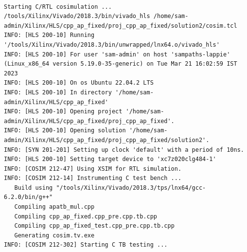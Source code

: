 \documentclass{article}
\begin{document}
\begin{lstlisting}

Starting C/RTL cosimulation ...
/tools/Xilinx/Vivado/2018.3/bin/vivado_hls /home/sam-admin/Xilinx/HLS/cpp_ap_fixed/proj_cpp_ap_fixed/solution2/cosim.tcl
INFO: [HLS 200-10] Running '/tools/Xilinx/Vivado/2018.3/bin/unwrapped/lnx64.o/vivado_hls'
INFO: [HLS 200-10] For user 'sam-admin' on host 'sampaths-lappie' (Linux_x86_64 version 5.19.0-35-generic) on Tue Mar 21 16:02:59 IST 2023
INFO: [HLS 200-10] On os Ubuntu 22.04.2 LTS
INFO: [HLS 200-10] In directory '/home/sam-admin/Xilinx/HLS/cpp_ap_fixed'
INFO: [HLS 200-10] Opening project '/home/sam-admin/Xilinx/HLS/cpp_ap_fixed/proj_cpp_ap_fixed'.
INFO: [HLS 200-10] Opening solution '/home/sam-admin/Xilinx/HLS/cpp_ap_fixed/proj_cpp_ap_fixed/solution2'.
INFO: [SYN 201-201] Setting up clock 'default' with a period of 10ns.
INFO: [HLS 200-10] Setting target device to 'xc7z020clg484-1'
INFO: [COSIM 212-47] Using XSIM for RTL simulation.
INFO: [COSIM 212-14] Instrumenting C test bench ...
   Build using "/tools/Xilinx/Vivado/2018.3/tps/lnx64/gcc-6.2.0/bin/g++"
   Compiling apatb_mul.cpp
   Compiling cpp_ap_fixed.cpp_pre.cpp.tb.cpp
   Compiling cpp_ap_fixed_test.cpp_pre.cpp.tb.cpp
   Generating cosim.tv.exe
INFO: [COSIM 212-302] Starting C TB testing ... 



\end{lstlisting}
\end{document}
